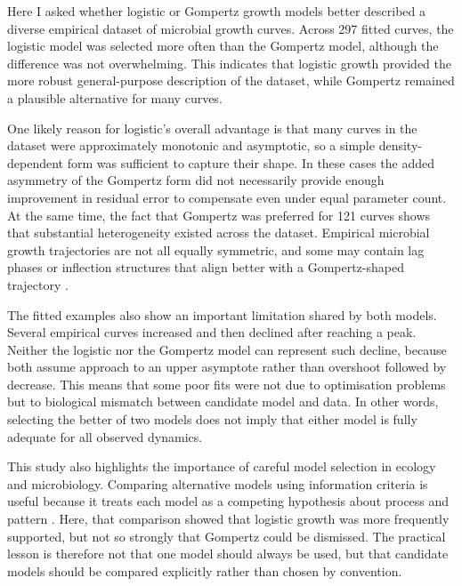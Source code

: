 \documentclass[11pt]{article}
\begin{document}
Here I asked whether logistic or Gompertz growth models better described a diverse empirical dataset of microbial growth curves. Across 297 fitted curves, the logistic model was selected more often than the Gompertz model, although the difference was not overwhelming. This indicates that logistic growth provided the more robust general-purpose description of the dataset, while Gompertz remained a plausible alternative for many curves.

One likely reason for logistic's overall advantage is that many curves in the dataset were approximately monotonic and asymptotic, so a simple density-dependent form was sufficient to capture their shape. In these cases the added asymmetry of the Gompertz form did not necessarily provide enough improvement in residual error to compensate even under equal parameter count. At the same time, the fact that Gompertz was preferred for 121 curves shows that substantial heterogeneity existed across the dataset. Empirical microbial growth trajectories are not all equally symmetric, and some may contain lag phases or inflection structures that align better with a Gompertz-shaped trajectory \citep{Zwietering1990}.

The fitted examples also show an important limitation shared by both models. Several empirical curves increased and then declined after reaching a peak. Neither the logistic nor the Gompertz model can represent such decline, because both assume approach to an upper asymptote rather than overshoot followed by decrease. This means that some poor fits were not due to optimisation problems but to biological mismatch between candidate model and data. In other words, selecting the better of two models does not imply that either model is fully adequate for all observed dynamics.

This study also highlights the importance of careful model selection in ecology and microbiology. Comparing alternative models using information criteria is useful because it treats each model as a competing hypothesis about process and pattern \citep{JohnsonOmland2004}. Here, that comparison showed that logistic growth was more frequently supported, but not so strongly that Gompertz could be dismissed. The practical lesson is therefore not that one model should always be used, but that candidate models should be compared explicitly rather than chosen by convention.
\end{document}
